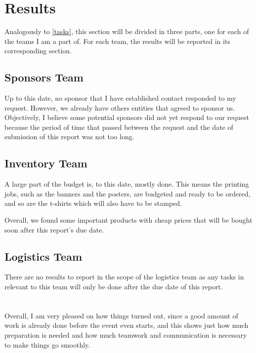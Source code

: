 \documentclass[a4paper,12pt,journal,twoside,compsoc]{PPIEEEtran}
\begin{document}


\section{Results}
\label{results}

Analogously to \cref{tasks}, this section will be divided in three parts, one for each of the teams I am a part of. For each team, the results will be reported in its corresponding section.

\subsection{Sponsors Team}

Up to this date, no sponsor that I have established contact responded to my request. However, we already have others entities that agreed to sponsor us.
Objectively, I believe some potential sponsors did not yet respond to our request because the period of time that passed between the request and the date of submission of this report was not too long.

\subsection{Inventory Team}

A large part of the budget is, to this date, mostly done. This means the printing jobs, such as the banners and the posters, are budgeted and ready to be ordered, and so are the t-shirts which will also have to be stamped.

Overall, we found some important products with cheap prices that will be bought soon after this report's due date.

\subsection{Logistics Team}

There are no results to report in the scope of the logistics team as any tasks in relevant to this team will only be done after the due date of this report.


\section{}
\label{concl}
Overall, I am very pleased on how things turned out, since a good amount of work is already done before the event even starts, and this shows just how much preparation is needed and how much teamwork and communication is necessary to make things go smoothly. 
\end{document}
